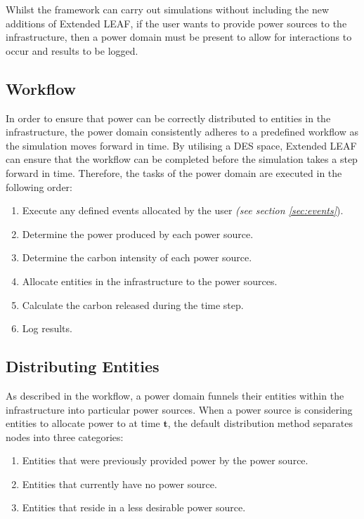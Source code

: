 \documentclass{l4proj}
\begin{document}
Whilst the framework can carry out simulations without including the new additions of Extended LEAF, if the user wants to provide power sources to the infrastructure, then a power domain must be present to allow for interactions to occur and results to be logged.

\subsection{Workflow}\label{subsec:power-domain-workflow}
In order to ensure that power can be correctly distributed to entities in the infrastructure, the power domain consistently adheres to a predefined workflow as the simulation moves forward in time.
By utilising a DES space, Extended LEAF can ensure that the workflow can be completed before the simulation takes a step forward in time.
Therefore, the tasks of the power domain are executed in the following order:
\begin{enumerate}
    \item Execute any defined events allocated by the user \emph{(see section \ref{sec:events}}).
    \item Determine the power produced by each power source.
    \item Determine the carbon intensity of each power source.
    \item Allocate entities in the infrastructure to the power sources.
    \item Calculate the carbon released during the time step.
    \item Log results.
\end{enumerate}

\subsection{Distributing Entities}\label{subsec:distributing-entities}
As described in the workflow, a power domain funnels their entities within the infrastructure into particular power sources.
When a power source is considering entities to allocate power to at time $\mathbf{t}$, the default distribution method separates nodes into three categories:
\begin{enumerate}
    \item Entities that were previously provided power by the power source.
    \item Entities that currently have no power source.
    \item Entities that reside in a less desirable power source.
\end{enumerate}
\end{document}
